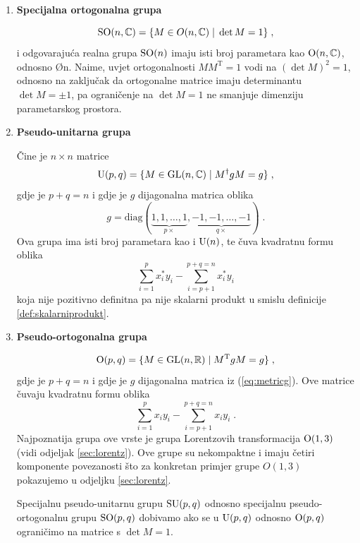 \begin{enumerate}[leftmargin=0pt, itemindent=0pt]
\item \textbf{Specijalna ortogonalna grupa}

\begin{equation}
\mathrm{SO}(n, \mathbb{C}) = \{ M\in O(n, \mathbb{C}) \; | \; \det M  = 1\} \;,
\end{equation}
i odgovarajuća realna grupa $\mathrm{SO}(n)$ imaju isti broj parametara kao
$\mathrm{O}(n, \mathbb{C})$, odnosno \O{n}. Naime, uvjet ortogonalnosti
$M M^{\mathrm{T}} = 1$ vodi na $(\det M)^2 = 1$, odnosno
na zaključak da ortogonalne matrice imaju determinantu $\det M = \pm 1$,
pa ograničenje na $\det M = 1$ ne smanjuje dimenziju parametarskog prostora.

\item \textbf{Pseudo-unitarna grupa}

Čine je $n\times n$ matrice
\begin{equation}
\mathrm{U}(p, q) = \{ M\in \mathrm{GL}(n,\mathbb{C}) \; | \; M^{\dagger} g M = g\} \;,
\end{equation}
gdje je $p+q=n$ i gdje je $g$ dijagonalna matrica oblika
\begin{equation}
  g = \mathrm{diag}(\underbrace{1, 1, \dots, 1}_{p \times},
\underbrace{-1, -1, \dots, -1}_{q \times}) \;.
\label{eq:metricg}
\end{equation}
Ova grupa ima isti broj parametara kao i $\mathrm{U}(n)$, te
čuva kvadratnu formu oblika
\begin{equation}
 \sum_{i=1}^{p} x_{i}^* y_{i} - \sum_{i=p+1}^{p+q=n} x_{i}^* y_i 
\end{equation}
koja nije pozitivno definitna pa nije skalarni produkt u smislu
definicije \ref{def:skalarniprodukt}.


\item \textbf{Pseudo-ortogonalna grupa}

\begin{equation}
\mathrm{O}(p, q) = \{ M\in \mathrm{GL}(n,\mathbb{R}) \; | \; M^{\mathrm{T}} g M = g \} \;,
\end{equation}
gdje je $p+q=n$ i gdje je $g$ dijagonalna matrica iz (\ref{eq:metricg}).
Ove matrice čuvaju kvadratnu formu oblika
\begin{equation}
 \sum_{i=1}^{p} x_{i} y_{i} - \sum_{i=p+1}^{p+q=n} x_{i} y_i  \;.
\end{equation}
Najpoznatija grupa ove vrste je grupa Lorentzovih transformacija  $\mathrm{O}(1,3)$
(vidi odjeljak \ref{sec:lorentz}). Ove grupe su nekompaktne i imaju
četiri komponente povezanosti što za 
konkretan primjer grupe $O(1,3)$ pokazujemo u odjeljku \ref{sec:lorentz}.

Specijalnu pseudo-unitarnu grupu $\mathrm{SU}(p,q)$ odnosno specijalnu pseudo-ortogonalnu
grupu $\mathrm{SO}(p,q)$ dobivamo ako se u $\mathrm{U}(p,q)$ odnosno $\mathrm{O}(p, q)$
ograničimo na matrice s $\det M = 1$.

\end{enumerate}


